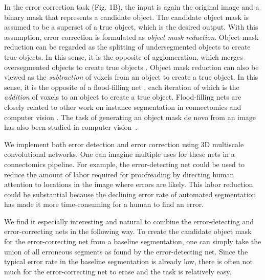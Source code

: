 \documentclass{article}
\begin{document}
In the error correction task (Fig. 1B), the input is again the original image and a binary mask that represents a candidate object. The candidate object mask is assumed to be a superset of a true object, which is the desired output. With this assumption, error correction is formulated as \emph{object mask reduction}.
Object mask reduction can be regarded as the splitting of undersegmented objects to create true objects. In this sense, it is the opposite of agglomeration, which merges oversegmented objects to create true objects \cite{lash,gala}. Object mask reduction can also be viewed as the \emph{subtraction} of voxels from an object to create a true object. In this sense, it is the opposite of a flood-filling net \cite{floodfilling,januszewski2017high}, each iteration of which is the \emph{addition} of voxels to an object to create a true object. Flood-filling nets are closely related to other work on instance segmentation in connectomics \cite{multipass} and computer vision \cite{recurrent_instance_seg_1, recurrent_instance_seg_2}.  The task of generating an object mask de novo from an image has also been studied in computer vision~\cite{pinheiro2015}.

We implement both error detection and error correction using 3D multiscale convolutional networks.  One can imagine multiple uses for these nets in a connectomics pipeline. For example, the error-detecting net could be used to reduce the amount of labor required for proofreading by directing human attention to locations in the image where errors are likely. This labor reduction could be substantial because the declining error rate of automated segmentation has made it more time-consuming for a human to find an error.

We find it especially interesting and natural to combine the error-detecting and error-correcting nets in the following way. To create the candidate object mask for the error-correcting net from a baseline segmentation, one can simply take the union of all erroneous segments as found by the error-detecting net. Since the typical error rate in the baseline segmentation is already low, there is often not much for the error-correcting net to erase and the task is relatively easy.

\end{document}
